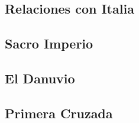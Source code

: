 \subsection{Relaciones con Italia}


\subsection{Sacro Imperio}


\subsection{El Danuvio}


\subsection{Primera Cruzada}


